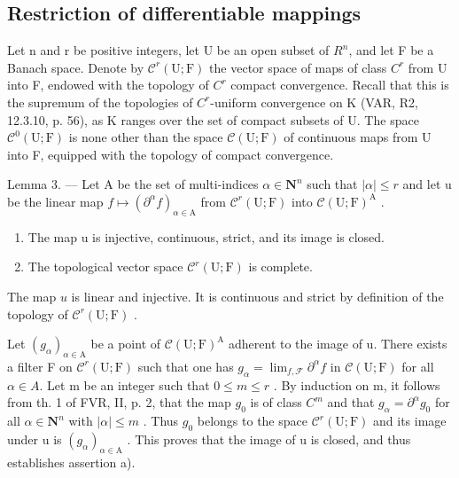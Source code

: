 \subsection{Restriction of differentiable mappings}

Let n and r be positive integers, let U be an open subset of \(R^{n}\), and let F be a Banach space. Denote by \(\mathcal{C}^{r}(\mathrm{U};\mathrm{F})\) the vector space of maps of class \(C^{r}\) from U into F, endowed with the topology of \(C^{r}\) compact convergence. Recall that this is the supremum of the topologies of \(C^{r}\)-uniform convergence on K (VAR, R2, 12.3.10, p. 56), as K ranges over the set of compact subsets of U. The space \(\mathcal{C}^{0}(\mathrm{U};\mathrm{F})\) is none other than the space \(\mathcal{C}(\mathrm{U};\mathrm{F})\) of continuous maps from U into F, equipped with the topology of compact convergence.

Lemma 3. --- Let A be the set of multi-indices \(\alpha \in \mathbf{N}^n\) such that \(|\alpha| \leqslant r\) and let u be the linear map \(f \mapsto (\partial^\alpha f)_{\alpha \in \mathrm{A}}\) from \(\mathcal{C}^r(\mathrm{U};\mathrm{F})\) into \(\mathcal{C}(\mathrm{U};\mathrm{F})^{\mathrm{A}}\) .

\begin{enumerate}
\def\labelenumi{\alph{enumi})}
\item
  The map u is injective, continuous, strict, and its image is closed.
\item
  The topological vector space \(\mathcal{C}^{r}(\mathrm{U};\mathrm{F})\) is complete.
\end{enumerate}

The map \(u\) is linear and injective. It is continuous and strict by definition of the topology of \(\mathcal{C}^r (\mathrm{U};\mathrm{F})\) .

Let \((g_{\alpha})_{\alpha\in\mathrm{A}}\) be a point of \(\mathcal{C}(\mathrm{U};\mathrm{F})^{\mathrm{A}}\) adherent to the image of u. There exists a filter F on \(\mathcal{C}^{r}(\mathrm{U};\mathrm{F})\) such that one has \(g_{\alpha}=\lim_{f,\mathcal{F}}\partial^{\alpha}f\) in \(\mathcal{C}(\mathrm{U};\mathrm{F})\) for all \(\alpha\in A\). Let m be an integer such that \(0\leqslant m\leqslant r\) . By induction on m, it follows from th. 1 of FVR, II, p. 2, that the map \(g_{0}\) is of class \(C^{m}\) and that \(g_{\alpha}=\partial^{\alpha}g_{0}\) for all \(\alpha\in\mathbf{N}^{n}\) with \(|\alpha|\leqslant m\) . Thus \(g_{0}\) belongs to the space \(\mathcal{C}^{r}(\mathrm{U};\mathrm{F})\) and its image under u is \((g_{\alpha})_{\alpha\in\mathrm{A}}\) . This proves that the image of u is closed, and thus establishes assertion a).

